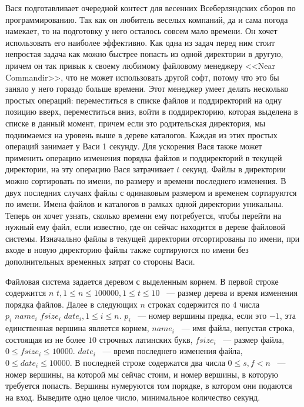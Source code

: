Вася подготавливает очередной контест для весенних
Всеберляндских сборов по программированию. Так как
он любитель веселых компаний, да и сама погода
намекает, то на подготовку у него осталось совсем мало времени.
Он хочет использовать его наиболее эффективно. Как одна из задач
перед ним стоит непростая задача как можно быстрее попасть
из одной директории в другую, причем он так привык к своему
любимому файловому менеджеру <<Near Commandir>>, что не может
использовать другой софт, потому что это бы заняло у него
гораздо больше времени. Этот менеджер умеет делать
несколько простых операций: переместиться в списке файлов и поддиректорий
на одну позицию вверх, переместиться вниз, войти в поддиректорию,
которая выделена в списке в данный момент, причем если это родительская
директория, мы поднимаемся на уровень выше в дереве каталогов.
Каждая из этих простых операций занимает у Васи 1 секунду.
Для ускорения Вася также может применить операцию изменения порядка файлов
и поддиректорий в текущей директории, на эту операцию Вася затрачивает $t$
секунд. Файлы в директории можно сортировать по имени,
по размеру и времени последнего изменения. В двух последних
случаях файлы с одинаковым размером и временем сортируются по имени.
Имена файлов и каталогов в рамках одной директории уникальны.
Теперь он хочет узнать, сколько времени ему потребуется,
чтобы перейти на нужный ему файл, если известно, где он сейчас
находится в дереве файловой системы. Изначально файлы в текущей директории
отсортированы по имени, при входе в новую директорию файлы
также сортируются по имени без дополнительных временных затрат
со стороны Васи.

\InputFile
Файловая система задается деревом с выделенным корнем. В первой строке
содержится $n \,\, t, 1 \le n \le 100000, 1 \le t \le 10$
~--- размер дерева и время изменения порядка файлов. Далее в следующих
$n$ строках содержится по $4$ числа
$p_i \,\, name_i \,\, fsize_i \,\, date_i, 1\le i \le n$.
$p_i$ ~--- номер вершины предка, если это $-1$, эта единственная вершина
является корнем, $name_i$ ~--- имя файла, непустая строка,
состоящая из не более $10$
строчных латинских букв, $fsize_i$ ~--- размер файла,
$0 \le fsize_i \le 10000$.
$date_i$ ~--- время последнего изменения файла, $0 \le date_i \le 10000$.
В последней строке содержатся два числа $0 \le s, f < n$ ~---
номер вершины, на которой мы сейчас стоим, и номер вершины, в которую
требуется попасть. Вершины нумеруются том порядке,
в котором они подаются на вход.
\OutputFile
Выведите одно целое число, минимальное количество секунд.
